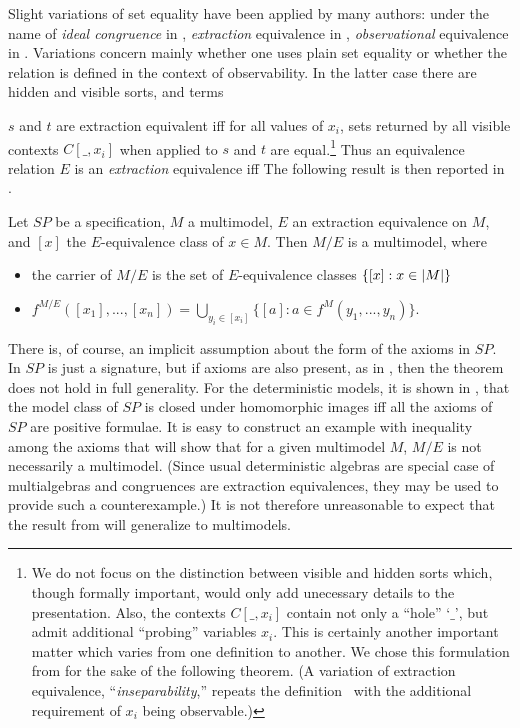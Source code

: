 Slight variations of set equality have been applied by many
authors: under the name of {\em ideal congruence} in \cite{c:102}, {\em
extraction} equivalence in \cite{c:53, c:121}, {\em observational} equivalence
in \cite{c:64}. Variations concern mainly whether one uses plain set equality
or whether the relation is defined in the context of observability. In
the latter case there are hidden and visible sorts, and terms {$s$ and
$t$ are extraction equivalent iff for all values of $x_i$, sets
returned by all visible contexts $C[\_,x_i]$ when applied to $s$ and
$t$ are equal.\footnote{We do not focus on the distinction between
visible and hidden sorts which, though formally important, would only
add unecessary details to the presentation.
Also, the
contexts $C[\_,x_i]$ contain not only a ``hole'' `$\_$', but admit
additional ``probing'' variables $x_i$. This is certainly another
important matter which varies from one definition to another. We chose
this formulation from \cite{c:53} for the sake of the following theorem.
(A variation of
extraction equivalence, ``{\em inseparability},'' repeats the definition~ with
the additional requirement of $x_i$ being observable.)}
Thus an equivalence relation $E$ is an {\em extraction} equivalence iff
\label{eq:214}
The following result is then reported in \cite{c:53, c:102}.
\begin{Theorem}  
Let $SP$ be a specification, $M$ a multimodel, $E$ 
an extraction equivalence on $M$, and $[x]$ the $E$-equivalence class 
of $x\in M$. Then $M/E$ is a multimodel, where
\begin{itemize}  
\item the carrier of $M/E$ is the set of $E$-equivalence classes 
$\{ [x]:x\in|M| \}$
\item $f^{M/E}([x_1],...,[x_n]) = \bigcup_{y_{i}\in[x_{i}]} \{ [a]:a\in f^{M}(y_1,...,y_n) \}$.
\end{itemize}
\end{Theorem}

\noindent
There is, of course, an implicit assumption about the form of the
axioms in $SP$. In \cite{c:102} $SP$ is just a signature, but if axioms are
also present, as in \cite{c:53}, then the theorem does not hold in full
generality. For the deterministic models, it is shown in \cite{c:74}, that
the model class of $SP$ is closed under homomorphic images iff all the
axioms of $SP$ are positive formulae. It is easy to construct an
example with inequality among the axioms that will show that for a
given multimodel $M$, $M/E$ is not necessarily a multimodel.  (Since
usual deterministic algebras are special case of multialgebras and
congruences are extraction equivalences, they may be used to provide such
a counterexample.)  It is not therefore unreasonable to expect that
the result from \cite{c:74} will generalize to multimodels.

}
